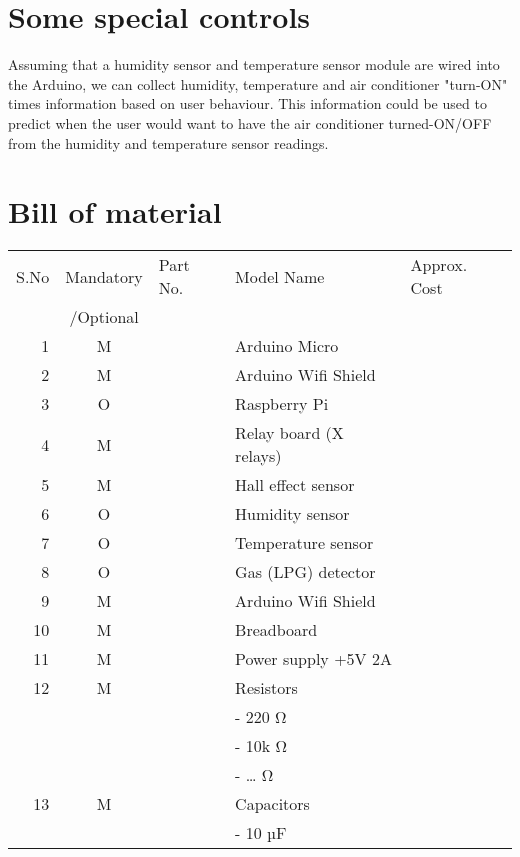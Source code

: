 \documentclass[a4paper,11pt,titlepage]{article}
\begin{document}
\section{Some special controls}
\label{sec:org3d50bea}
Assuming that a humidity sensor and temperature sensor module are
wired into the Arduino, we can collect humidity, temperature and air
conditioner "turn-ON" times information based on user behaviour. This
information could be used to predict when the user would want to have
the air conditioner turned-ON/OFF from the humidity and temperature
sensor readings.

\section{Bill of material}
\label{sec:orgbc063b6}
\begin{center}
\begin{tabular}{rclll}
S.No & Mandatory & Part No. & Model Name & Approx. Cost\\
 & /Optional &  &  & \\
\hline
1 & M &  & Arduino Micro & \\
2 & M &  & Arduino Wifi Shield & \\
3 & O &  & Raspberry Pi & \\
4 & M &  & Relay board (X relays) & \\
5 & M &  & Hall effect sensor & \\
6 & O &  & Humidity sensor & \\
7 & O &  & Temperature sensor & \\
8 & O &  & Gas (LPG) detector & \\
9 & M &  & Arduino Wifi Shield & \\
10 & M &  & Breadboard & \\
11 & M &  & Power supply +5V 2A & \\
12 & M &  & Resistors & \\
 &  &  & - 220 Ω & \\
 &  &  & - 10k Ω & \\
 &  &  & - \ldots{} Ω & \\
13 & M &  & Capacitors & \\
 &  &  & - 10 µF & \\
\end{tabular}
\end{center}
\end{document}

